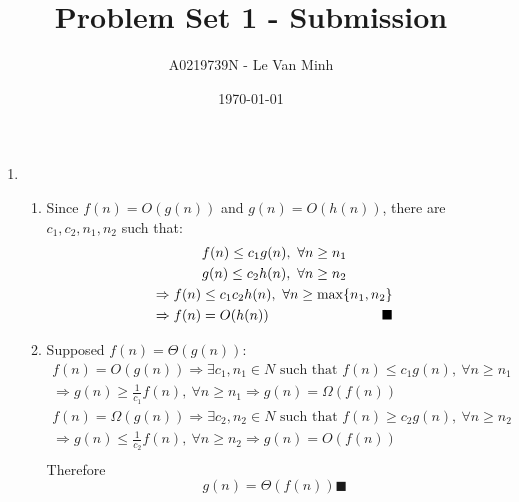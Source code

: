 \documentclass{article}
\title{Problem Set 1 - Submission}
\author{A0219739N - Le Van Minh}
\date{\today}
\begin{document}
\maketitle
\begin{enumerate}[leftmargin=\labelsep]
  \item \begin{enumerate}
    \item Since $f(n) = O(g(n))$ and $g(n) = O(h(n))$, there are $c_1, c_2, n_1, n_2$ such that:
      \begin{gather*}
        f(n) \le c_1 g(n) ,\  \forall n \ge n_1 \\
        g(n) \le c_2 h(n) ,\  \forall n \ge n_2 \\
        \Rightarrow f(n) \le c_1 c_2 h(n) ,\  \forall n \ge \max \{n_1, n_2\} \\
        \Rightarrow f(n) = O(h(n)) \hfill \blacksquare
      \end{gather*}

    \item Supposed $f(n) = \Theta (g(n))$:
      \begin{gather*}
        f(n) = O(g(n)) \Rightarrow \exists c_1, n_1 \in N \text{ such that } f(n) \le c_1 g(n),\ \forall n \ge n_1 \\
        \Rightarrow g(n) \ge \frac{1}{c_1} f(n),\ \forall n \ge n_1 \Rightarrow g(n) = \Omega(f(n)) \\
        f(n) = \Omega(g(n)) \Rightarrow \exists c_2, n_2 \in N \text{ such that } f(n) \ge c_2 g(n),\ \forall n \ge n_2 \\
        \Rightarrow g(n) \le \frac{1}{c_2} f(n),\ \forall n \ge n_2 \Rightarrow g(n) = O(f(n)) \\
      \end{gather*}
    Therefore 
      \[
        g(n) = \Theta(f(n)) \blacksquare
      \]
  \end{enumerate}
  

\end{enumerate}
\end{document}
